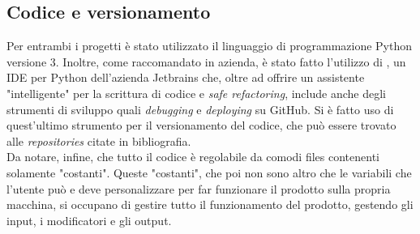     \subsection{Codice e versionamento}
    Per entrambi i progetti è stato utilizzato il linguaggio di programmazione Python\cite{prod:python} versione 3. Inoltre, come raccomandato in azienda, è stato fatto l'utilizzo di \cite{prod:PyCharm}, un IDE per Python dell'azienda Jetbrains\textsuperscript{\textcopyright{}} che, oltre ad offrire un assistente "intelligente" per la scrittura di codice e \textit{safe refactoring}, include anche degli strumenti di sviluppo quali \textit{debugging} e \textit{deploying} su GitHub\cite{site:github}. Si è fatto uso di quest'ultimo strumento per il versionamento del codice, che può essere trovato alle \textit{repositories} citate in bibliografia.
    \medskip
    \\Da notare, infine, che tutto il codice è regolabile da comodi files contenenti solamente "costanti". Queste "costanti", che poi non sono altro che le variabili che l'utente può e deve personalizzare per far funzionare il prodotto sulla propria macchina, si occupano di gestire tutto il funzionamento del prodotto, gestendo gli input, i modificatori e gli output.

